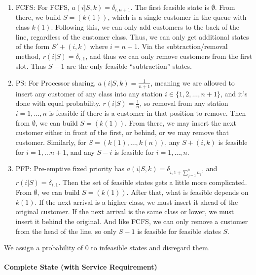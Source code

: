 \documentclass[12pt,titlepage]{article}
\theoremstyle{plain}
\theoremstyle{definition}
\theoremstyle{remark}
\begin{document}
\begin{enumerate}%
\item FCFS: For FCFS, $a(i|S,k) = \delta_{i,n+1}$. The first feasible state is $\emptyset$. From there, we build $S = (k(1))$, which is a single customer in the queue with class $k(1)$. Following this, we can only add customers to the back of the line, regardless of the customer class. Thus, we can only get additional states of the form $S' + (i,k)$ where $i = n+1$. Via the subtraction/removal method, $r(i|S) = \delta_{i,1}$, and thus we can only remove customers from the first slot. Thus $S-1$ are the only feasible ``subtraction'' states.


\item PS: For Processor sharing, $a(i|S,k) = \frac{1}{n+1}$, meaning we are allowed to insert any customer of any class into any station $i \in \{1,2,\ldots, n+1\}$, and it's done with equal probability. $r(i|S) = \frac{1}{n}$, so removal from any station $i=1,\ldots,n$ is feasible if there is a customer in that position to remove. Then from $\emptyset$, we can build $S = (k(1))$. From there, we may insert the next customer either in front of the first, or behind, or we may remove that customer. Similarly, for $S = (k(1),\ldots,k(n))$, any $S + (i,k)$ is feasible for $i=1,\ldots n+1$, and any $S-i$ is feasible for $i=1,\ldots,n$.


\item PFP: Pre-emptive fixed priority has $a(i|S,k) = \delta_{i,1+\sum_{j=1}^{k}n_{j}}$, and $r(i|S) = \delta_{i,1}$. Then the set of feasible states gets a little more complicated. From $\emptyset$, we can build $S = (k(1))$. After that, what is feasible depends on $k(1)$. If the next arrival is a higher class, we must insert it ahead of the original customer. If the next arrival is the same class or lower, we must insert it behind the original. And like FCFS, we can only remove a customer from the head of the line, so only $S-1$ is feasible for feasible states $S$.



\end{enumerate}
We assign a probability of 0 to infeasible states and disregard them.

\hypertarget{complete_state_with_service_requirement}{}\paragraph*{{Complete State (with Service Requirement)}}\label{complete_state_with_service_requirement}
\end{document}
